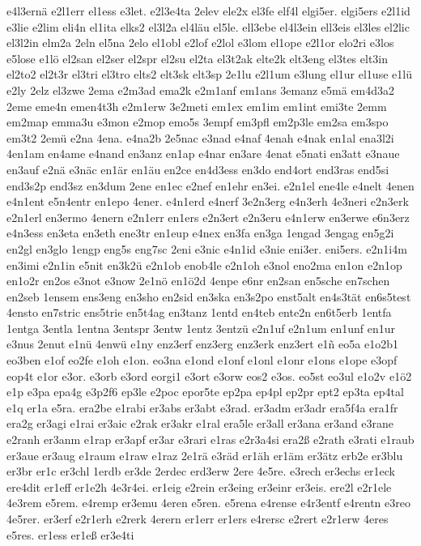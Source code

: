 {e4l3ernä
e2l1err
el1ess
e3let.
e2l3e4ta
2elev
ele2x
el3fe
elf4l
elgi5er.
elgi5ers
e2l1id
e3lie
e2lim
eli4n
el1ita
elks2
el3l2a
el4läu
el5le.
ell3ebe
el4l3ein
ell3eis
el3les
el2lic
el3l2in
elm2a
2eln
el5na
2elo
el1obl
e2lof
e2lol
e3lom
el1ope
e2l1or
elo2ri
e3los
e5lose
e1lö
el2san
el2ser
el2spr
el2su
el2ta
el3t2ak
elte2k
elt3eng
el3tes
elt3in
el2to2
el2t3r
el3tri
el3tro
elts2
elt3sk
elt3sp
2e1lu
e2l1um
e3lung
el1ur
el1use
e1lü
e2ly
2elz
el3zwe
2ema
e2m3ad
ema2k
e2m1anf
em1ans
3emanz
e5mä
em4d3a2
2eme
eme4n
emen4t3h
e2m1erw
3e2meti
em1ex
em1im
em1int
emi3te
2emm
em2map
emma3u
e3mon
e2mop
emo5s
3empf
em3pfl
em2p3le
em2sa
em3spo
em3t2
2emü
e2na
4ena.
e4na2b
2e5nac
e3nad
e4naf
4enah
e4nak
en1al
ena3l2i
4en1am
en4ame
e4nand
en3anz
en1ap
e4nar
en3are
4enat
e5nati
en3att
e3naue
en3auf
e2nä
e3näc
en1är
en1äu
en2ce
en4d3ess
en3do
end4ort
end3ras
end5si
end3s2p
end3sz
en3dum
2ene
en1ec
e2nef
en1ehr
en3ei.
e2n1el
ene4le
e4nelt
4enen
e4n1ent
e5n4entr
en1epo
4ener.
e4n1erd
e4nerf
3e2n3erg
e4n3erh
4e3neri
e2n3erk
e2n1erl
en3ermo
4enern
e2n1err
en1ers
e2n3ert
e2n3eru
e4n1erw
en3erwe
e6n3erz
e4n3ess
en3eta
en3eth
ene3tr
en1eup
e4nex
en3fa
en3ga
1engad
3engag
en5g2i
en2gl
en3glo
1engp
eng5s
eng7sc
2eni
e3nic
e4n1id
e3nie
eni3er.
eni5ers.
e2n1i4m
en3imi
e2n1in
e5nit
en3k2ü
e2n1ob
enob4le
e2n1oh
e3nol
eno2ma
en1on
e2n1op
en1o2r
en2os
e3not
e3now
2e1nö
en1ö2d
4enpe
e6nr
en2san
en5sche
en7schen
en2seb
1ensem
ens3eng
en3sho
en2sid
en3ska
en3s2po
enst5alt
en4s3tät
en6s5test
4ensto
en7stric
ens5trie
en5t4ag
en3tanz
1entd
en4teb
ente2n
en6t5erb
1entfa
1entga
3entla
1entna
3entspr
3entw
1entz
3entzü
e2n1uf
e2n1um
en1unf
en1ur
e3nus
2enut
e1nü
4enwü
e1ny
enz3erf
enz3erg
enz3erk
enz3ert
e1ñ
eo5a
e1o2b1
eo3ben
e1of
eo2fe
e1oh
e1on.
eo3na
e1ond
e1onf
e1onl
e1onr
e1ons
e1ope
e3opf
eop4t
e1or
e3or.
e3orb
e3ord
eorgi1
e3ort
e3orw
eos2
e3os.
eo5st
eo3ul
e1o2v
e1ö2
e1p
e3pa
epa4g
e3p2f6
ep3le
e2poc
epor5te
ep2pa
ep4pl
ep2pr
ept2
ep3ta
ep4tal
e1q
er1a
e5ra.
era2be
e1rabi
er3abs
er3abt
e3rad.
er3adm
er3adr
era5f4a
era1fr
era2g
er3agi
e1rai
er3aic
e2rak
er3akr
e1ral
era5le
er3all
er3ana
er3and
e3rane
e2ranh
er3anm
e1rap
er3apf
er3ar
e3rari
e1ras
e2r3a4si
era2ß
e2rath
e3rati
e1raub
er3aue
er3aug
e1raum
e1raw
e1raz
2e1rä
e3räd
er1äh
er1äm
er3ätz
erb2e
er3blu
er3br
er1c
er3chl
1erdb
er3de
2erdec
erd3erw
2ere
4e5re.
e3rech
er3echs
er1eck
ere4dit
er1eff
er1e2h
4e3r4ei.
er1eig
e2rein
er3eing
er3einr
er3eis.
ere2l
e2r1ele
4e3rem
e5rem.
e4remp
er3emu
4eren
e5ren.
e5rena
e4rense
e4r3entf
e4rentn
e3reo
4e5rer.
er3erf
e2r1erh
e2rerk
4erern
er1err
er1ers
e4rersc
e2rert
e2r1erw
4eres
e5res.
er1ess
er1eß
er3e4ti
}
